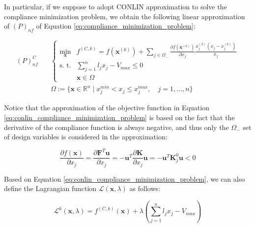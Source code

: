 In particular, if we suppose to adopt CONLIN approximation to solve the compliance minimization problem, we obtain the following linear approximation of $(P)_{nf}$ of Equation \ref{eq:compliance_minimization_problem}:

\begin{equation}
    \begin{aligned}
        (P)_{nf}^C \quad & \begin{cases}
                               \min_{\bm{x}} & f^{(C, k)} = f(\bm{x}^{(k)}) + \sum_{j \in \Omega_-} \frac{\partial f(\bm{x}^{(k)})}{\partial x_j} \frac{x_j^{(k)}(x_j - x_j^{(k)})}{x_j} \\
                               \text{s. t.}  & \sum_{j=1}^{n} l_j x_j - V_{max} \leq 0                                                                                                   \\
                                             & \bm{x} \in \Omega
                           \end{cases} \\
                         & \Omega := \{ \bm{x} \in \mathbb{R}^n \mid x_j^{min} < x_j \le x_j^{max}, \quad j = 1, \dots, n \}
    \end{aligned}
    \label{eq:conlin_compliance_minimization_problem}
\end{equation}

Notice that the approximation of the objective function in Equation \ref{eq:conlin_compliance_minimization_problem} is based on the fact that the derivative of the compliance function is always negative, and thus only the $\Omega_-$ set of design variables is considered in the approximation:

\begin{equation}
    \frac{\partial f(\bm{x})}{\partial x_j} = \frac{\partial \bm{F}^T \bm{u}}{\partial x_j} = -\bm{u}^T \frac{\partial \bm{K}}{\partial x_j} \bm{u} = -\bm{u}^T \bm{K}_j^0 \bm{u} < 0
    \label{eq:compliance_derivative}
\end{equation}

Based on Equation \ref{eq:conlin_compliance_minimization_problem}, we can also define the Lagrangian function $\mathcal{L}(\bm{x}, \lambda)$ as follows:

\begin{equation}
    \mathcal{L}^{k}(\bm{x}, \lambda) = f^{(C, k)}(\bm{x}) + \lambda \left( \sum_{j=1}^{n} l_j x_j - V_{max} \right)
    \label{eq:lagrangian_compliance_minimization}
\end{equation}

